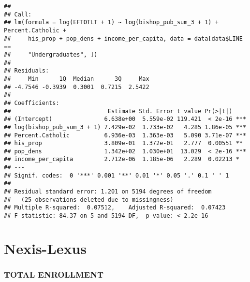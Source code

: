 \documentclass[]{article}
\newenvironment{Shaded}{\begin{snugshade}}{\end{snugshade}}
\newcommand{\KeywordTok}[1]{\textcolor[rgb]{0.13,0.29,0.53}{\textbf{#1}}}
\newcommand{\DataTypeTok}[1]{\textcolor[rgb]{0.13,0.29,0.53}{#1}}
\newcommand{\DecValTok}[1]{\textcolor[rgb]{0.00,0.00,0.81}{#1}}
\newcommand{\StringTok}[1]{\textcolor[rgb]{0.31,0.60,0.02}{#1}}
\newcommand{\OperatorTok}[1]{\textcolor[rgb]{0.81,0.36,0.00}{\textbf{#1}}}
\newcommand{\NormalTok}[1]{#1}
\begin{document}
\begin{verbatim}
## 
## Call:
## lm(formula = log(EFTOTLT + 1) ~ log(bishop_pub_sum_3 + 1) + Percent.Catholic + 
##     his_prop + pop_dens + income_per_capita, data = data[data$LINE == 
##     "Undergraduates", ])
## 
## Residuals:
##     Min      1Q  Median      3Q     Max 
## -4.7546 -0.3939  0.3001  0.7215  2.5422 
## 
## Coefficients:
##                            Estimate Std. Error t value Pr(>|t|)    
## (Intercept)               6.638e+00  5.559e-02 119.421  < 2e-16 ***
## log(bishop_pub_sum_3 + 1) 7.429e-02  1.733e-02   4.285 1.86e-05 ***
## Percent.Catholic          6.936e-03  1.363e-03   5.090 3.71e-07 ***
## his_prop                  3.809e-01  1.372e-01   2.777  0.00551 ** 
## pop_dens                  1.342e+02  1.030e+01  13.029  < 2e-16 ***
## income_per_capita         2.712e-06  1.185e-06   2.289  0.02213 *  
## ---
## Signif. codes:  0 '***' 0.001 '**' 0.01 '*' 0.05 '.' 0.1 ' ' 1
## 
## Residual standard error: 1.201 on 5194 degrees of freedom
##   (25 observations deleted due to missingness)
## Multiple R-squared:  0.07512,    Adjusted R-squared:  0.07423 
## F-statistic: 84.37 on 5 and 5194 DF,  p-value: < 2.2e-16
\end{verbatim}

\section{Nexis-Lexus}\label{nexis-lexus}

\subsubsection{TOTAL ENROLLMENT}\label{total-enrollment-1}

\begin{Shaded}
\end{Shaded}
\end{document}
